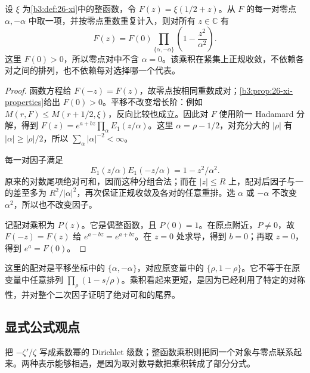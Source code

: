 \begin{proposition}[关于中点配对的乘积]
\label{b3:prop:26-centered-product}
设 \(\xi\) 为\cref{b3:def:26-xi}中的整函数，令 \(F(z)=\xi(1/2+z)\)。从 \(F\) 的每一对零点 \(\alpha,-\alpha\) 中取一项，并按零点重数重复计入，则对所有 \(z\in\mathbb C\) 有
\[
 F(z)=F(0)\prod_{\{\alpha,-\alpha\}}
                    \left(1-\frac{z^2}{\alpha^2}\right).
\]
这里 \(F(0)>0\)，所以零点对中不含 \(\alpha=0\)。该乘积在紧集上正规收敛，不依赖各对之间的排列，也不依赖每对选择哪一个代表。
\end{proposition}
\begin{proof}
函数方程给 \(F(-z)=F(z)\)，故零点按相同重数成对；\cref{b3:prop:26-xi-properties}给出 \(F(0)>0\)。平移不改变增长阶：例如 \(M(r,F)\le M(r+1/2,\xi)\)，反向比较也成立。因此对 \(F\) 使用阶一 Hadamard 分解，得到 \(F(z)=e^{a+bz}\prod_\alpha E_1(z/\alpha)\)。这里 \(\alpha=\rho-1/2\)，对充分大的 \(|\rho|\) 有 \(|\alpha|\ge|\rho|/2\)，所以 \(\sum_\alpha|\alpha|^{-2}<\infty\)。

每一对因子满足
\[
 E_1(z/\alpha)E_1(-z/\alpha)=1-z^2/\alpha^2.
\]
原来的对数尾项绝对可和，因而这种分组合法；而在 \(|z|\le R\) 上，配对后因子与一的差至多为 \(R^2/|\alpha|^2\)，再次保证正规收敛及各对的任意重排。选 \(\alpha\) 或 \(-\alpha\) 不改变 \(\alpha^2\)，所以也不改变因子。

记配对乘积为 \(P(z)\)。它是偶整函数，且 \(P(0)=1\)。在原点附近，\(P\ne0\)，故 \(F(-z)=F(z)\) 给 \(e^{a-bz}=e^{a+bz}\)。在 \(z=0\) 处求导，得到 \(b=0\)；再取 \(z=0\)，得到 \(e^a=F(0)\)。
\end{proof}

这里的配对是平移坐标中的 \(\{\alpha,-\alpha\}\)，对应原变量中的 \(\{\rho,1-\rho\}\)。它不等于在原变量中任意排列 \(\prod_\rho(1-s/\rho)\)。乘积看起来更短，是因为已经利用了特定的对称性，并对整个二次因子证明了绝对可和的尾界。

\subsection{显式公式观点}
\label{b3:subsec:260605}

把 \(-\zeta'/\zeta\) 写成素数幂的 Dirichlet 级数；整函数乘积则把同一个对象与零点联系起来。两种表示能够相遇，是因为取对数导数把乘积转成了部分分式。

